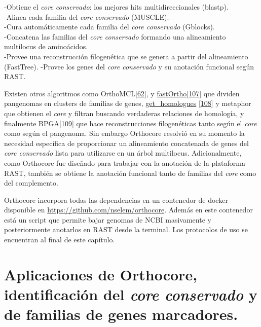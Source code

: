 \documentclass[12pt,twoside]{reedthesis}
\begin{document}
  -Obtiene el \emph{core conservado}: los mejores hits multidireccionales
  (blastp).\\
  -Alinea cada familia del \emph{core conservado} (MUSCLE).\\
  -Cura automáticamente cada familia del \emph{core conservado}
  (Gblocks).\\
  -Concatena las familias del \emph{core conservado} formando una
  alineamiento multilocus de aminoácidos.\\
  -Provee una reconstrucción filogenética que se genera a partir del
  alineamiento (FastTree). -Provee los genes del \emph{core conservado} y
  su anotación funcional según RAST.
  
  Existen otros algoritmos como
  OrthoMCL{[}\protect\hyperlink{ref-li_orthomcl_2003}{62}{]}, y
  \href{https://github.com/grovesdixon/using_FastOrtho}{fastOrtho}{[}\protect\hyperlink{ref-wattam_patric_2014}{107}{]}
  que dividen pangenomas en clusters de familias de genes,
  \href{http://eead-csic-compbio.github.io/get_homologues/manual/}{get\_homologues}
  {[}\protect\hyperlink{ref-contreras-moreira_get_homologues_2013}{108}{]}
  y metaphor que obtienen el \emph{core} y filtran buscando verdaderas
  relaciones de homología, y finalmente
  BPGA{[}\protect\hyperlink{ref-chaudhari_bpga-_2016}{109}{]} que hace
  reconstrucciones filogenéticas tanto según el \emph{core} como según el
  pangenoma. Sin embargo Orthocore resolvió en su momento la necesidad
  específica de proporcionar un alineamiento concatenada de genes del
  \emph{core conservado} lista para utilizarse en un árbol multilocus.
  Adicionalmente, como Orthocore fue diseñado para trabajar con la
  anotación de la plataforma RAST, también se obtiene la anotación
  funcional tanto de familias del \emph{core} como del complemento.
  
  Orthocore incorpora todas las dependencias en un contenedor de docker
  disponible en \url{https://github.com/nselem/orthocore}. Además en este
  contenedor está un script que permite bajar genomas de NCBI masivamente
  y posteriormente anotarlos en RAST desde la terminal. Los protocolos de
  uso se encuentran al final de este capítulo.
  
  \section{\texorpdfstring{Aplicaciones de Orthocore, identificación del
  \emph{core conservado} y de familias de genes
  marcadores.}{Aplicaciones de Orthocore, identificación del core conservado y de familias de genes marcadores.}}\label{aplicaciones-de-orthocore-identificacion-del-core-conservado-y-de-familias-de-genes-marcadores.}
  
\end{document}
